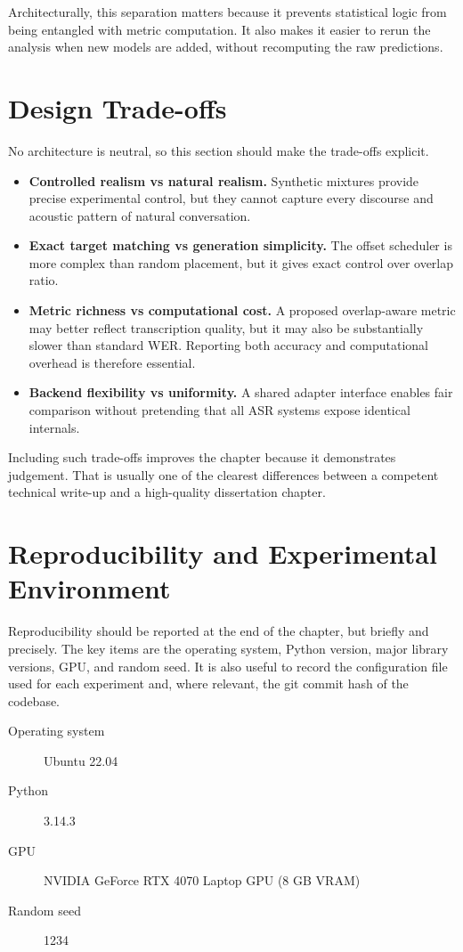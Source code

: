 Architecturally, this separation matters because it prevents statistical logic from being entangled with metric computation. It also makes it easier to rerun the analysis when new models are added, without recomputing the raw predictions.

\section{Design Trade-offs}
No architecture is neutral, so this section should make the trade-offs explicit.

\begin{itemize}
    \item \textbf{Controlled realism vs natural realism.} Synthetic mixtures provide precise experimental control, but they cannot capture every discourse and acoustic pattern of natural conversation.
    \item \textbf{Exact target matching vs generation simplicity.} The offset scheduler is more complex than random placement, but it gives exact control over overlap ratio.
    \item \textbf{Metric richness vs computational cost.} A proposed overlap-aware metric may better reflect transcription quality, but it may also be substantially slower than standard WER. Reporting both accuracy and computational overhead is therefore essential.
    \item \textbf{Backend flexibility vs uniformity.} A shared adapter interface enables fair comparison without pretending that all ASR systems expose identical internals.
\end{itemize}

Including such trade-offs improves the chapter because it demonstrates judgement. That is usually one of the clearest differences between a competent technical write-up and a high-quality dissertation chapter.

\section{Reproducibility and Experimental Environment}
Reproducibility should be reported at the end of the chapter, but briefly and precisely. The key items are the operating system, Python version, major library versions, GPU, and random seed. It is also useful to record the configuration file used for each experiment and, where relevant, the git commit hash of the codebase.

\begin{description}
    \item[Operating system] Ubuntu 22.04
    \item[Python] 3.14.3
    \item[GPU] NVIDIA GeForce RTX 4070 Laptop GPU (8 GB VRAM)
    \item[Random seed] 1234
\end{description}

